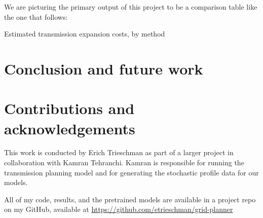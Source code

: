 \documentclass[10pt,twocolumn,letterpaper]{article}
\begin{document}
We are picturing the primary output of this project to be a comparison table like the one that follows:
\begin{table}[!htbp]
    \tiny
    \begin{center}
        \caption{\label{fig:summ} Estimated transmission expansion costs, by method}
        
    \end{center}
\end{table}

\section{Conclusion and future work}
\label{sec:conclusion}


\section{Contributions and acknowledgements}
\label{sec:contrib}
This work is conducted by Erich Trieschman as part of a larger project in collaboration with Kamran Tehranchi. Kamran is responsible for running the transmission planning model and for generating the stochastic profile data for our models. 

All of my code, results, and the pretrained models are available in a project repo on my GitHub, available at \url{https://github.com/etrieschman/grid-planner}

{\small


}
\end{document}
